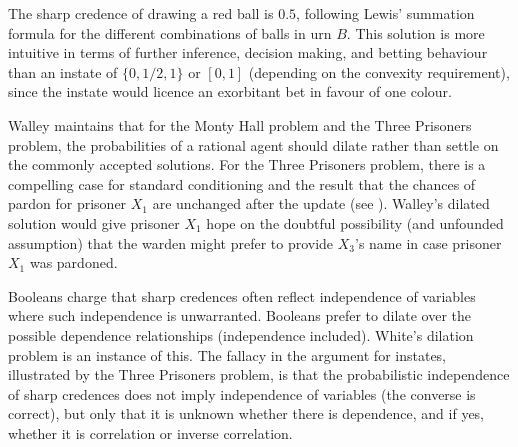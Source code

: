 The sharp credence of drawing a red ball is $0.5$,
following Lewis' summation formula for the different
combinations of balls in urn $B$. This solution is more
intuitive in terms of further inference, decision
making, and betting behaviour than an instate of
$\{0,1/2,1\}$ or $[0,1]$ (depending on the convexity
requirement), since the instate would licence an
exorbitant bet in favour of one colour.


Walley maintains that for the Monty Hall problem and
the Three Prisoners problem, the probabilities of a
rational agent should dilate rather than settle on the
commonly accepted solutions. For the Three Prisoners
problem, there is a compelling case for standard
conditioning and the result that the chances of pardon
for prisoner $X_{1}$ are unchanged after the update
(see ). Walley's dilated
solution would give prisoner $X_{1}$ hope on the
doubtful possibility (and unfounded assumption) that
the warden might prefer to provide $X_{3}$'s name in
case prisoner $X_{1}$ was pardoned.

Booleans charge that sharp credences often reflect
independence of variables where such independence is
unwarranted. Booleans prefer to dilate over the
possible dependence relationships (independence
included). White's dilation problem is an instance of
this. The fallacy in the argument for instates,
illustrated by the Three Prisoners problem, is that the
probabilistic independence of sharp credences does not
imply independence of variables (the converse is
correct), but only that it is unknown whether there is
dependence, and if yes, whether it is correlation or
inverse correlation.


